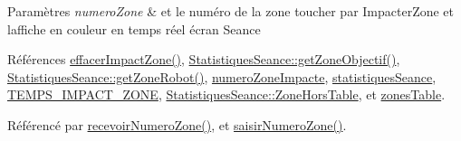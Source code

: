 \begin{DoxyParams}{Paramètres}
{\em numero\+Zone} & et le numéro de la zone toucher par Impacter\+Zone et l\textquotesingle{}affiche en couleur en temps réel écran Seance \\
\hline
\end{DoxyParams}


Références \hyperlink{class_ttpa_ihm_abe9973c64673cdaa067617f9246781d2}{effacer\+Impact\+Zone()}, \hyperlink{class_statistiques_seance_a61c01cb1d35cda871e8243658213ee5b}{Statistiques\+Seance\+::get\+Zone\+Objectif()}, \hyperlink{class_statistiques_seance_ad1bdc22fbd9f37fab06d9fc24e9f1bc4}{Statistiques\+Seance\+::get\+Zone\+Robot()}, \hyperlink{class_ttpa_ihm_af8fa0aee928ee727f27ff605c0c1d991}{numero\+Zone\+Impacte}, \hyperlink{class_ttpa_ihm_abed6897d6f7b4d3a5eb8dcc07651e740}{statistiques\+Seance}, \hyperlink{ttpaihm_8h_a9b6e17fdcabfecc63689f88d52e369ad}{T\+E\+M\+P\+S\+\_\+\+I\+M\+P\+A\+C\+T\+\_\+\+Z\+O\+NE}, \hyperlink{class_statistiques_seance_aa839f5192cbadd7c3fb3651d62eff8b5aeb6ef225df9153e1f46a968ae71bf2f3}{Statistiques\+Seance\+::\+Zone\+Hors\+Table}, et \hyperlink{class_ttpa_ihm_af77d75f1aa3eb901b9410e5fc465ece8}{zones\+Table}.



Référencé par \hyperlink{class_ttpa_ihm_a0070bf0027c8a903e5bb5a543533e82c}{recevoir\+Numero\+Zone()}, et \hyperlink{class_ttpa_ihm_a9b22616e3a4e52ad2ecfe1818d5fadb2}{saisir\+Numero\+Zone()}.


